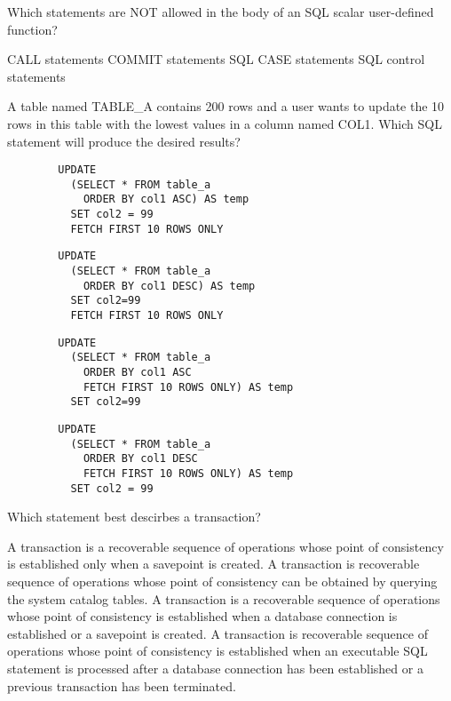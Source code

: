 \documentclass[11pt]{exam}
\begin{document}
\begin{questions}
\question[1]
Which statements are NOT allowed in the body of an SQL scalar user-defined function?
\begin{choices}
\choice CALL statements
\choice COMMIT statements
\choice SQL CASE statements
\choice SQL control statements
\end{choices}

\newpage
\question[1]
A table named TABLE\_A contains 200 rows and a user wants to update the 10 rows in this table with the
lowest values in a column named COL1. Which SQL statement will produce the desired results?
\begin{choices}
\choice \begin{verbatim}
		UPDATE
		  (SELECT * FROM table_a
		    ORDER BY col1 ASC) AS temp
		  SET col2 = 99
		  FETCH FIRST 10 ROWS ONLY
		\end{verbatim}
\choice \begin{verbatim}
		UPDATE
		  (SELECT * FROM table_a
		    ORDER BY col1 DESC) AS temp
		  SET col2=99
		  FETCH FIRST 10 ROWS ONLY
		\end{verbatim}
\choice \begin{verbatim}
		UPDATE
		  (SELECT * FROM table_a
		    ORDER BY col1 ASC
	  		FETCH FIRST 10 ROWS ONLY) AS temp
	  	  SET col2=99
		\end{verbatim}
\choice \begin{verbatim}
		UPDATE
		  (SELECT * FROM table_a
		    ORDER BY col1 DESC
		    FETCH FIRST 10 ROWS ONLY) AS temp
		  SET col2 = 99
		\end{verbatim}
\end{choices}

\question[1]
Which statement best descirbes a transaction?
\begin{choices}
\choice A transaction is a recoverable sequence of operations whose point of consistency is established
only when a savepoint is created.
\choice A transaction is recoverable sequence of operations whose point of consistency can be obtained
by querying the system catalog tables.
\choice A transaction is a recoverable sequence of operations whose point of consistency is established
when a database connection is established or a savepoint is created.
\choice A transaction is recoverable sequence of operations whose point of consistency is established
when an executable SQL statement is processed after a database connection has been established or a
previous transaction has been terminated.
\end{choices}


\end{questions}
\end{document}

